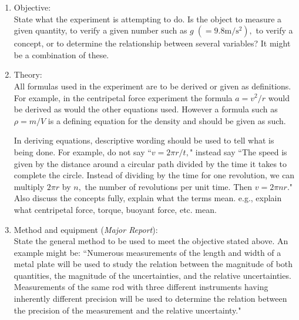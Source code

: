 \documentclass[main.tex]{subfiles}
\begin{document}
\begin{enumerate}
\item
Objective:\\
State what the experiment is attempting to do. Is the object to measure a given quantity, to verify a given number such as $g\;(=9.8\text{m}/\text{s}^2),$ to verify a concept, or to determine the relationship between several variables? It might be a combination of these.
\item
Theory:\\
All formulas used in the experiment are to be derived or given as definitions. For example, in the centripetal force experiment the formula $a=v^2/r$ would be derived as would the other equations used. However a formula such as $\rho=m/V$ is a defining equation for the density and should be given as such.

In deriving equations, descriptive wording should be used to tell what is being done. For example, do not say ``$v=2\pi r/t,$" instead say ``The speed is given by the distance around a circular path divided by the time it takes to complete the circle. Instead of dividing by the time for one revolution, we can multiply $2\pi r$ by $n,$ the number of revolutions per unit time. Then $v=2\pi nr.$" Also discuss the concepts fully, explain what the terms mean. e.g., explain what centripetal force, torque, buoyant force, etc. mean.
\item
Method and equipment (\emph{Major Report}):\\
State the general method to be used to meet the objective stated above. An example might be: ``Numerous measurements of the length and width of a metal plate will be used to study the relation between the magnitude of both quantities, the magnitude of the uncertainties, and the relative uncertainties. Measurements of the same rod with three different instruments having inherently different precision will be used to determine the relation between the precision of the measurement and the relative uncertainty."


\end{enumerate}
\end{document}

